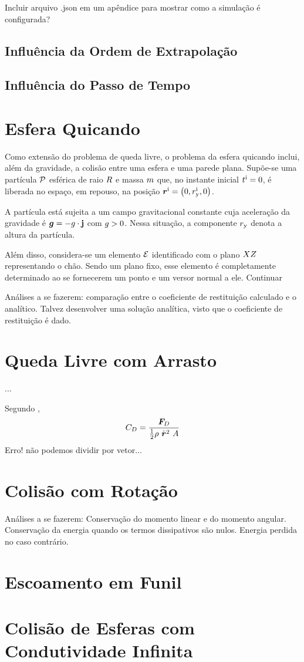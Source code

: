 \alert{Incluir arquivo .json em um apêndice para mostrar como a simulação é configurada?}

\subsection{Influência da Ordem de Extrapolação}

\subsection{Influência do Passo de Tempo}

\section{Esfera Quicando}

Como extensão do problema de queda livre, o problema da esfera quicando inclui, além da gravidade, a colisão entre uma esfera e uma parede plana. Supõe-se uma partícula \(\mathcal{P}\) esférica de raio \(R\) e massa \(m\) que, no instante inicial \(t^{\text{i}}=0\), é liberada no espaço, em repouso, na posição \(\initial{\position} = \explicitVector{0}{\initial{\yComponent{\positionScalar}}}{0}\).

A partícula está sujeita a um campo gravitacional constante cuja aceleração da gravidade é \(\bm{g} = -g\cdot\mathbf{j}\) com \(g>0\). Nessa situação, a componente \({r}_{\text{y}}\) denota a altura da partícula.

Além disso, considera-se um elemento \(\mathcal{E}\) identificado com o plano \(XZ\) representando o chão. Sendo um plano fixo, esse elemento é completamente determinado ao se fornecerem um ponto e um versor normal a ele. \alert{Continuar}

\alert{Análises a se fazerem: comparação entre o coeficiente de restituição calculado e o analítico. Talvez desenvolver uma solução analítica, visto que o coeficiente de restituição é dado.}

\section{Queda Livre com Arrasto}

\alert{...}

Segundo ,
\begin{equation*}
	\dragCoefficient = \dfrac{\dragForce}{\frac{1}{2}\density\ \velocity^2\ \projectedArea}
\end{equation*}
\alert{Erro! não podemos dividir por vetor...}

\section{Colisão com Rotação}

\alert{Análises a se fazerem: Conservação do momento linear e do momento angular. Conservação da energia quando os termos dissipativos são nulos. Energia perdida no caso contrário.}

\section{Escoamento em Funil}
\section{Colisão de Esferas com Condutividade Infinita}
